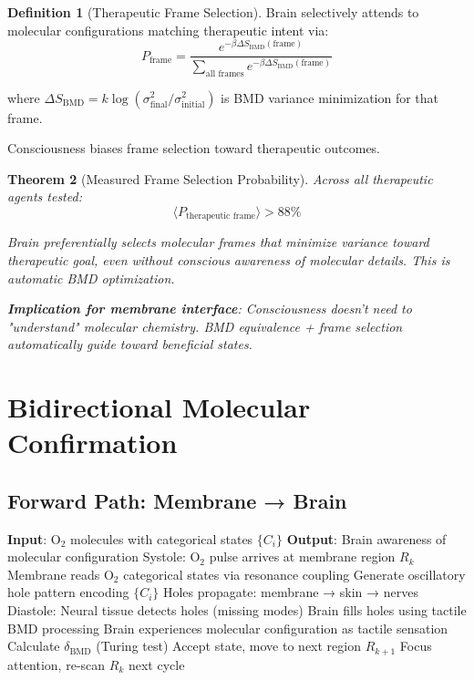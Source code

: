 \documentclass[11pt,a4paper]{article}
\newtheorem{theorem}{Theorem}[section]
\theoremstyle{definition}
\newtheorem{definition}[theorem]{Definition}
\theoremstyle{remark}
\begin{document}
\begin{definition}[Therapeutic Frame Selection]
Brain selectively attends to molecular configurations matching therapeutic intent via:
\begin{equation}
P_{\text{frame}} = \frac{e^{-\beta \Delta S_{\text{BMD}}(\text{frame})}}{\sum_{\text{all frames}} e^{-\beta \Delta S_{\text{BMD}}(\text{frame})}}
\end{equation}

where $\Delta S_{\text{BMD}} = k \log(\sigma^2_{\text{final}}/\sigma^2_{\text{initial}})$ is BMD variance minimization for that frame.

Consciousness biases frame selection toward therapeutic outcomes.
\end{definition}

\begin{theorem}[Measured Frame Selection Probability]
Across all therapeutic agents tested:
\begin{equation}
\langle P_{\text{therapeutic frame}} \rangle > 88\%
\end{equation}

Brain preferentially selects molecular frames that minimize variance toward therapeutic goal, even without conscious awareness of molecular details. This is automatic BMD optimization.

\textbf{Implication for membrane interface}: Consciousness doesn't need to "understand" molecular chemistry. BMD equivalence + frame selection automatically guide toward beneficial states.
\end{theorem}

\section{Bidirectional Molecular Confirmation}

\subsection{Forward Path: Membrane → Brain}

\begin{algorithm}[H]
\caption{Forward Information Transfer}
\begin{algorithmic}[1]
\STATE \textbf{Input}: O$_2$ molecules with categorical states $\{C_i\}$
\STATE \textbf{Output}: Brain awareness of molecular configuration
    \STATE Systole: O$_2$ pulse arrives at membrane region $R_k$
    \STATE Membrane reads O$_2$ categorical states via resonance coupling
    \STATE Generate oscillatory hole pattern encoding $\{C_i\}$
    \STATE Holes propagate: membrane → skin → nerves
    \STATE Diastole: Neural tissue detects holes (missing modes)
    \STATE Brain fills holes using tactile BMD processing
    \STATE Brain experiences molecular configuration as tactile sensation
    \STATE Calculate $\delta_{\text{BMD}}$ (Turing test)
        \STATE Accept state, move to next region $R_{k+1}$
    \ELSE
        \STATE Focus attention, re-scan $R_k$ next cycle
    \ENDIF
\ENDFOR
\end{algorithmic}
\end{algorithm}
\end{document}
